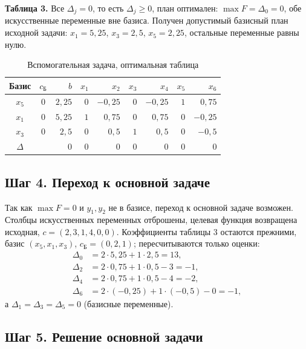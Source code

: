 \documentclass[a4paper,12pt]{article}
\begin{document}
\textbf{Таблица 3.} Все $\Delta_j = 0$, то есть $\Delta_j \ge 0$, план оптимален: $\max F = \Delta_0 = 0$, обе искусственные переменные вне базиса. Получен допустимый базисный план исходной задачи: $x_1 = 5{,}25$, $x_3 = 2{,}5$, $x_5 = 2{,}25$, остальные переменные равны нулю.

\begin{table}[H]
\centering\small
\caption{Вспомогательная задача, оптимальная таблица}
\begin{tabular}{|c|c|r|r|r|r|r|r|r|}
\hline
Базис & $c_{\text{Б}}$ & $b$ & $x_{1}$ & $x_{2}$ & $x_{3}$ & $x_{4}$ & $x_{5}$ & $x_{6}$ \\ \hline
$x_{5}$ & $0$ & $2{,}25$ & $0$ & $-0{,}25$ & $0$ & $-0{,}25$ & $1$ & $0{,}75$ \\
$x_{1}$ & $0$ & $5{,}25$ & $1$ & $0{,}75$ & $0$ & $0{,}75$ & $0$ & $-0{,}25$ \\
$x_{3}$ & $0$ & $2{,}5$ & $0$ & $0{,}5$ & $1$ & $0{,}5$ & $0$ & $-0{,}5$ \\
\hline
$\Delta$ & & $0$ & $0$ & $0$ & $0$ & $0$ & $0$ & $0$ \\ \hline
\end{tabular}
\end{table}

\subsection*{Шаг 4. Переход к основной задаче}

Так как $\max F = 0$ и $y_1, y_2$ не в базисе, переход к основной задаче возможен. Столбцы искусственных переменных отброшены, целевая функция возвращена исходная, $c = (2,3,1,4,0,0)$. Коэффициенты таблицы 3 остаются прежними, базис $(x_5, x_1, x_3)$, $c_{\text{Б}} = (0,2,1)$; пересчитываются только оценки:
\begin{align*}
\Delta_0 &= 2\cdot 5{,}25 + 1\cdot 2{,}5 = 13,\\
\Delta_2 &= 2\cdot 0{,}75 + 1\cdot 0{,}5 - 3 = -1,\\
\Delta_4 &= 2\cdot 0{,}75 + 1\cdot 0{,}5 - 4 = -2,\\
\Delta_6 &= 2\cdot(-0{,}25) + 1\cdot(-0{,}5) - 0 = -1,
\end{align*}
а $\Delta_1 = \Delta_3 = \Delta_5 = 0$ (базисные переменные).

\subsection*{Шаг 5. Решение основной задачи}
\end{document}
